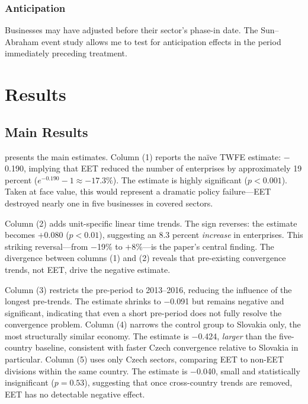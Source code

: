 \documentclass[12pt]{article}
\begin{document}
\subsubsection*{Anticipation} Businesses may have adjusted before their sector's phase-in date. The Sun--Abraham event study allows me to test for anticipation effects in the period immediately preceding treatment.


\section{Results}

\subsection{Main Results}



 presents the main estimates. Column (1) reports the na\"{i}ve TWFE estimate: $-$0.190, implying that EET reduced the number of enterprises by approximately 19 percent ($e^{-0.190} - 1 \approx -17.3\%$). The estimate is highly significant ($p < 0.001$). Taken at face value, this would represent a dramatic policy failure---EET destroyed nearly one in five businesses in covered sectors.

Column (2) adds unit-specific linear time trends. The sign reverses: the estimate becomes $+$0.080 ($p < 0.01$), suggesting an 8.3 percent \textit{increase} in enterprises. This striking reversal---from $-$19\% to $+$8\%---is the paper's central finding. The divergence between columns (1) and (2) reveals that pre-existing convergence trends, not EET, drive the negative estimate.

Column (3) restricts the pre-period to 2013--2016, reducing the influence of the longest pre-trends. The estimate shrinks to $-$0.091 but remains negative and significant, indicating that even a short pre-period does not fully resolve the convergence problem. Column (4) narrows the control group to Slovakia only, the most structurally similar economy. The estimate is $-$0.424, \textit{larger} than the five-country baseline, consistent with faster Czech convergence relative to Slovakia in particular. Column (5) uses only Czech sectors, comparing EET to non-EET divisions within the same country. The estimate is $-$0.040, small and statistically insignificant ($p = 0.53$), suggesting that once cross-country trends are removed, EET has no detectable negative effect.
\end{document}

